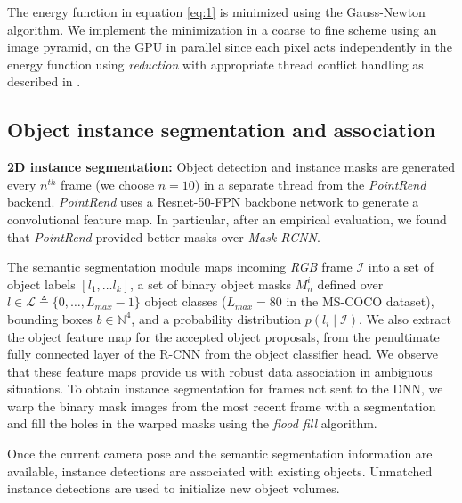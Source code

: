 The energy function in equation \ref{eq:1} is minimized using the Gauss-Newton algorithm. We implement the minimization in a coarse to fine scheme using an image pyramid, on the GPU in parallel since each pixel acts independently in the energy function using \textit{reduction} with appropriate thread conflict handling as described in \cite{dongGPUAcceleratedRobust2019}.



\subsection{Object instance segmentation and association} \label{subsec: segmentation}

\textbf{2D instance segmentation:} Object detection and instance masks are generated every $n^{th}$ frame (we choose $n=10$) in a separate thread from the \textit{PointRend} backend. \textit{PointRend} uses a Resnet-50-FPN backbone network to generate a convolutional feature map. In particular, after an empirical evaluation, we found that \textit{PointRend} provided better masks over \textit{Mask-RCNN}.

The semantic segmentation module maps incoming \textit{RGB} frame \(\mathcal{I}\) into a set of object labels $[l_1, \dots l_k]$, a set of binary object masks $M_n^i$ defined over $l \in \mathcal{L} \triangleq \{0, \dots, L_{max}-1\}$ object classes ($L_{max}=80$ in the MS-COCO dataset), bounding boxes $b \in \mathbb{N}^4$, and a probability distribution $p(l_i \mid \mathcal{I})$. We also extract the object feature map for the accepted object proposals, from the penultimate fully connected layer of the R-CNN from the object classifier head. We observe that these feature maps provide us with robust data association in ambiguous situations.
%
To obtain instance segmentation for frames not sent to the DNN, we warp the binary mask images from the most recent frame with a segmentation and fill the holes in the warped masks using the \textit{flood fill} algorithm.

Once the current camera pose and the semantic segmentation information are available, instance detections are associated with existing objects. Unmatched instance detections are used to initialize new object volumes.

